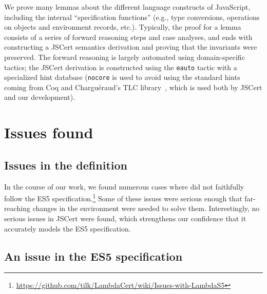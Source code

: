 \documentclass{llncs}
\begin{document}
We prove many lemmas about the different language constructs
of JavaScript, including the internal ``specification functions''
(e.g., type conversions, operations on objects and environment
records, etc.). Typically, the proof for a lemma consists of
a series of forward reasoning steps and case analyses, and ends with
constructing a JSCert semantics derivation and proving that
the invariants were preserved. The forward reasoning is largely
automated using domain-specific tactics; the JSCert derivation
is constructed using the \texttt{eauto} tactic with a specialized
hint database (\texttt{nocore} is used to avoid using the standard
hints coming from Coq and Chargu\'eraud's TLC
library~\cite{TLC}, which is
used both by JSCert and our development).

\section{Issues found}

\subsection{Issues in the \lambdajs definition}

In the course of our work, we found numerous cases where
\lambdajs did not faithfully follow the ES5 
specification.\footnote{\url{https://github.com/tilk/LambdaCert/wiki/Issues-with-LambdaS5}}
Some of these issues were serious enough that
far-reaching changes in the \lambdajs environment were needed
to solve them. Interestingly, no serious issues in JSCert were
found, which strengthens our confidence that it accurately models
the ES5 specification.

\subsection{An issue in the ES5 specification}
\end{document}

